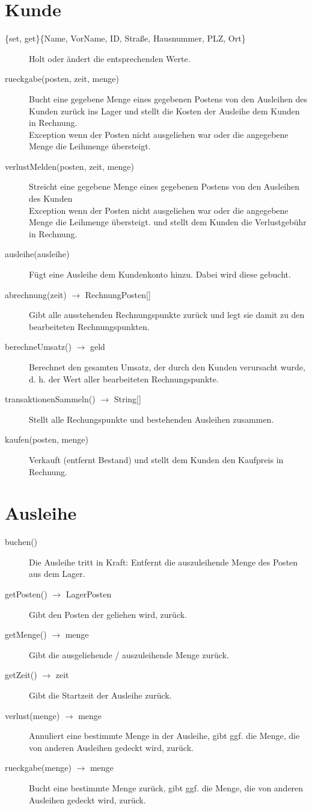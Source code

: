 \documentclass[a4paper,12pt,titlepage]{article}
\begin{document}
\section{Kunde}
\begin{description}
\item[\{set, get\}\{Name, VorName, ID, Straße, Hausnummer, PLZ, Ort\}]
Holt oder ändert die entsprechenden Werte.
\item[rueckgabe(posten, zeit, menge)]
Bucht eine gegebene Menge eines gegebenen Postens von den Ausleihen des Kunden zurück ins Lager
und stellt die Kosten der Ausleihe dem Kunden in Rechnung.\\
Exception wenn der Posten nicht ausgeliehen war oder die angegebene Menge die Leihmenge übersteigt.
\item[verlustMelden(posten, zeit, menge)]
Streicht eine gegebene Menge eines gegebenen Postens von den Ausleihen des Kunden\\
Exception wenn der Posten nicht ausgeliehen war oder die angegebene Menge die Leihmenge übersteigt.
und stellt dem Kunden die Verlustgebühr in Rechnung.
\item[ausleihe(ausleihe)]
Fügt eine Ausleihe dem Kundenkonto hinzu. Dabei wird diese gebucht.
\item[abrechnung(zeit) $\rightarrow$ RechnungPosten{[]}]
Gibt alle ausstehenden Rechnungspunkte zurück und legt sie damit zu den bearbeiteten Rechnungspunkten.
\item[berechneUmsatz() $\rightarrow$ geld]
Berechnet den gesamten Umsatz, der durch den Kunden verursacht wurde, d. h. der Wert aller bearbeiteten Rechnungspunkte.
\item[transaktionenSammeln() $\rightarrow$ String{[]}]
Stellt alle Rechungspunkte und bestehenden Ausleihen zusammen.
\item[kaufen(posten, menge)]
Verkauft (entfernt Bestand) und stellt dem Kunden den Kaufpreis in Rechnung.
\end{description}
\section{Ausleihe}
\begin{description}
\item[buchen()]
Die Ausleihe tritt in Kraft: Entfernt die auszuleihende Menge des Posten aus dem Lager.
\item[getPosten() $\rightarrow$ LagerPosten]
Gibt den Posten der geliehen wird, zurück.
\item[getMenge() $\rightarrow$ menge]
Gibt die ausgeliehende / auszuleihende Menge zurück.
\item[getZeit() $\rightarrow$ zeit]
Gibt die Startzeit der Ausleihe zurück.
\item[verlust(menge) $\rightarrow$ menge]
Annuliert eine bestimmte Menge in der Ausleihe, gibt ggf. die Menge, die von anderen Ausleihen gedeckt wird, zurück.
\item[rueckgabe(menge) $\rightarrow$ menge]
Bucht eine bestimmte Menge zurück, gibt ggf. die Menge, die von anderen Ausleihen gedeckt wird, zurück.
\end{description}
\end{document}
